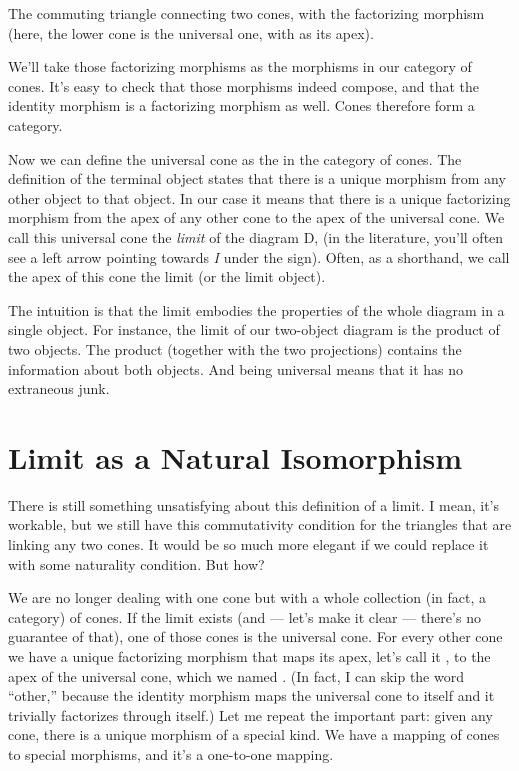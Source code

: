The commuting triangle connecting two cones, with the factorizing
morphism ~ (here, the lower cone is the universal one, with
 as its apex).

We'll take those factorizing morphisms as the morphisms in our category
of cones. It's easy to check that those morphisms indeed compose, and
that the identity morphism is a factorizing morphism as well. Cones
therefore form a category.

Now we can define the universal cone as the  in
the category of cones. The definition of the terminal object states that
there is a unique morphism from any other object to that object. In our
case it means that there is a unique factorizing morphism from the apex
of any other cone to the apex of the universal cone. We call this
universal cone the \emph{limit} of the diagram D,  (in
the literature, you'll often see a left arrow pointing towards \emph{I}
under the  sign). Often, as a shorthand, we call the apex of
this cone the limit (or the limit object).

The intuition is that the limit embodies the properties of the whole
diagram in a single object. For instance, the limit of our two-object
diagram is the product of two objects. The product (together with the
two projections) contains the information about both objects. And being
universal means that it has no extraneous junk.

\section{Limit as a Natural
Isomorphism}\label{limit-as-a-natural-isomorphism}

There is still something unsatisfying about this definition of a limit.
I mean, it's workable, but we still have this commutativity condition
for the triangles that are linking any two cones. It would be so much
more elegant if we could replace it with some naturality condition. But
how?

We are no longer dealing with one cone but with a whole collection (in
fact, a category) of cones. If the limit exists (and --- let's make it
clear --- there's no guarantee of that), one of those cones is the
universal cone. For every other cone we have a unique factorizing
morphism that maps its apex, let's call it , to the apex of
the universal cone, which we named . (In fact, I can skip
the word ``other,'' because the identity morphism maps the universal
cone to itself and it trivially factorizes through itself.) Let me
repeat the important part: given any cone, there is a unique morphism of
a special kind. We have a mapping of cones to special morphisms, and
it's a one-to-one mapping.

